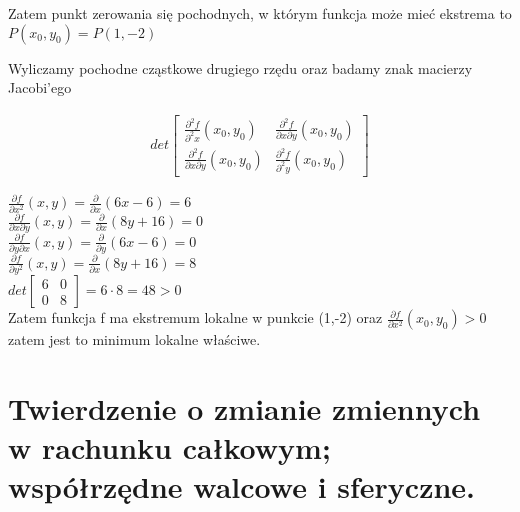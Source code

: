 \documentclass[main.tex]{subfiles}
\begin{document}
\begin{itemize}
        Zatem punkt zerowania się pochodnych, w którym funkcja może mieć ekstrema to $P(x_0,y_0) = P(1,-2)$

        Wyliczamy pochodne cząstkowe drugiego rzędu oraz badamy znak macierzy Jacobi'ego

        \begin{equation}
            \begin{aligned}
                det \begin{bmatrix}
                        \frac{\partial^2 f}{\partial^2 x}(x_0, y_0) & \frac{\partial^2 f}{\partial x \partial y}(x_0, y_0) \\
                        \frac{\partial^2 f}{\partial x \partial y}(x_0, y_0) & \frac{\partial^2 f}{\partial^2 y}(x_0, y_0)
                \end{bmatrix}
            \end{aligned}
        \end{equation}
        \newpage

        $\frac{\partial f}{\partial x^2} (x,y) = \frac{\partial}{\partial x} \left( 6x - 6 \right) = 6$
        \\

        $\frac{\partial f}{\partial x \partial y} (x,y)  =  \frac{\partial}{\partial x} \left( 8y + 16 \right) = 0$
        \\

        $\frac{\partial f}{\partial y \partial x} (x,y) = \frac{\partial}{\partial y} \left( 6x - 6 \right) = 0$
        \\

        $\frac{\partial f}{\partial y^2} (x,y)  = \frac{\partial}{\partial x} \left( 8y + 16 \right) = 8$
        \\

        $ det \begin{bmatrix}
                  6 & 0 \\
                  0 & 8
        \end{bmatrix} = 6 \cdot 8 = 48 > 0$ \\

        Zatem funkcja f ma ekstremum lokalne w punkcie (1,-2) oraz $\frac{\partial f}{\partial x^2}(x_0, y_0) > 0$ zatem jest to minimum lokalne właściwe.

    \end{itemize}
    \newpage

    \section{Twierdzenie o zmianie zmiennych w rachunku całkowym; współrzędne walcowe i sferyczne.}
\end{document}
